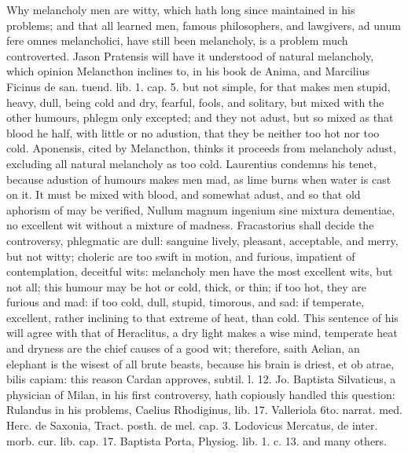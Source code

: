 {Why melancholy men are witty, which \Aristotle{} hath long since
maintained in his problems; and that all learned men, famous
philosophers, and lawgivers, ad unum fere omnes melancholici, have
still been melancholy, is a problem much controverted. Jason Pratensis
will have it understood of natural melancholy, which opinion Melancthon
inclines to, in his book de Anima, and Marcilius Ficinus de san. tuend.
lib. 1. cap. 5. but not simple, for that makes men stupid, heavy, dull,
being cold and dry, fearful, fools, and solitary, but mixed with the
other humours, phlegm only excepted; and they not adust, but so
mixed as that blood he half, with little or no adustion, that they be
neither too hot nor too cold. Aponensis, cited by Melancthon, thinks it
proceeds from melancholy adust, excluding all natural melancholy as too
cold. Laurentius condemns his tenet, because adustion of humours makes
men mad, as lime burns when water is cast on it. It must be mixed with
blood, and somewhat adust, and so that old aphorism of \Aristotle{} may be
verified, Nullum magnum ingenium sine mixtura dementiae, no excellent
wit without a mixture of madness. Fracastorius shall decide the
controversy, phlegmatic are dull: sanguine lively, pleasant,
acceptable, and merry, but not witty; choleric are too swift in motion,
and furious, impatient of contemplation, deceitful wits: melancholy men
have the most excellent wits, but not all; this humour may be hot or
cold, thick, or thin; if too hot, they are furious and mad: if too
cold, dull, stupid, timorous, and sad: if temperate, excellent, rather
inclining to that extreme of heat, than cold. This sentence of his will
agree with that of Heraclitus, a dry light makes a wise mind, temperate
heat and dryness are the chief causes of a good wit; therefore, saith
Aelian, an elephant is the wisest of all brute beasts, because his
brain is driest, et ob atrae, bilis capiam: this reason Cardan
approves, subtil. l. 12. Jo. Baptista Silvaticus, a physician of Milan,
in his first controversy, hath copiously handled this question:
Rulandus in his problems, Caelius Rhodiginus, lib. 17. Valleriola 6to.
narrat. med. Herc. de Saxonia, Tract. posth. de mel. cap. 3. Lodovicus
Mercatus, de inter. morb. cur. lib. cap. 17. Baptista Porta, Physiog.
lib. 1. c. 13. and many others.

}
